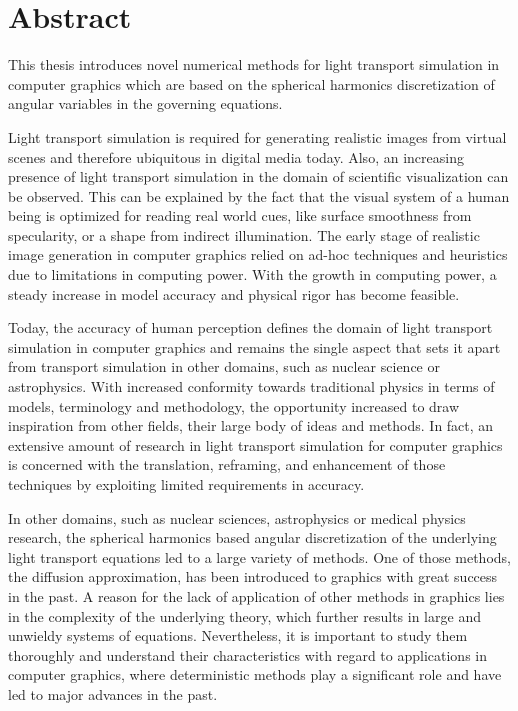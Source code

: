 \chapter*{Abstract}
%
%
This thesis introduces novel numerical methods for light transport simulation in computer graphics which are based on the spherical harmonics discretization of angular variables in the governing equations.

Light transport simulation is required for generating realistic images from virtual scenes and therefore ubiquitous in digital media today. Also, an increasing presence of light transport simulation in the domain of scientific visualization can be observed. This can be explained by the fact that the visual system of a human being is optimized for reading real world cues, like surface smoothness from specularity, or a shape from indirect illumination. The early stage of realistic image generation in computer graphics relied on ad-hoc techniques and heuristics due to limitations in computing power. With the growth in computing power, a steady increase in model accuracy and physical rigor has become feasible.

Today, the accuracy of human perception defines the domain of light transport simulation in computer graphics and remains the single aspect that sets it apart from transport simulation in other domains, such as nuclear science or astrophysics. With increased conformity towards traditional physics in terms of models, terminology and methodology, the opportunity increased to draw inspiration from other fields, their large body of ideas and methods. In fact, an extensive amount of research in light transport simulation for computer graphics is concerned with the translation, reframing, and enhancement of those techniques by exploiting limited requirements in accuracy.

In other domains, such as nuclear sciences, astrophysics or medical physics research, the spherical harmonics based angular discretization of the underlying light transport equations led to a large variety of methods. One of those methods, the diffusion approximation, has been introduced to graphics with great success in the past. A reason for the lack of application of other methods in graphics lies in the complexity of the underlying theory, which further results in large and unwieldy systems of equations. Nevertheless, it is important to study them thoroughly and understand their characteristics with regard to applications in computer graphics, where deterministic methods play a significant role and have led to major advances in the past.

